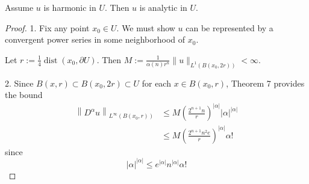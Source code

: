 \begin{theorem}[Analyticity]
    Assume $u$ is harmonic in $U$. Then $u$ is analytic in $U$.
    \begin{proof}
        1. Fix any point $x_0 \in U$. We must show $u$ can be represented by a convergent power series in some neighborhood of $x_0$.

        Let $r:=\frac{1}{4} \operatorname{dist}\left(x_0, \partial U\right)$. Then $M:=\frac{1}{\alpha(n) r^n}\|u\|_{L^1\left(B\left(x_0, 2 r\right)\right)}<\infty$.

        2. Since $B(x, r) \subset B\left(x_0, 2 r\right) \subset U$ for each $x \in B\left(x_0, r\right)$, Theorem 7 provides the bound
        \begin{equation*}
            \begin{aligned}
                \left\|D^\alpha u\right\|_{L^{\infty}\left(B\left(x_0, r\right)\right)} & \leq M\left(\frac{2^{n+1} n}{r}\right)^{|\alpha|}|\alpha|^{|\alpha|} \\
                                                                                        & \leq
                M\left(\frac{2^{n+1} n^2 e}{r}\right)^{|\alpha|} \alpha!
            \end{aligned}
        \end{equation*}
        since
        \begin{equation*}
            |\alpha|^{|\alpha|}
            \leq e^{|\alpha|} n^{|\alpha|} \alpha!
        \end{equation*}


\end{proof}
\end{theorem}
